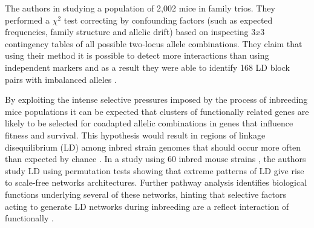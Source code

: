 The authors in \cite{ackermann2012systematic} studying a population of 2,002 mice in family trios.
They performed a $\chi^2$ test correcting by confounding factors (such as expected frequencies, family structure and allelic drift) based on inspecting $3 x 3$ contingency tables of all possible two-locus allele combinations.
They claim that using their method it is possible to detect more interactions than using independent markers and as a result they were able to identify 168 LD block pairs with imbalanced alleles \cite{ackermann2012systematic}.

By exploiting the  intense selective pressures imposed by the process of inbreeding mice populations it can be expected that clusters of functionally related genes are likely to be selected for coadapted allelic combinations in genes that influence fitness and survival.
This hypothesis would result in regions of linkage disequilibrium (LD) among inbred strain genomes that should occur more often than expected by chance \cite{petkov2005evidence}.
In a study using 60 inbred mouse strains \cite{petkov2005evidence}, the authors study LD using permutation tests showing that extreme patterns of LD give rise to scale-free networks architectures.
Further pathway analysis identifies biological functions underlying several of these networks, hinting that selective factors acting to generate LD networks during inbreeding are a reflect  interaction of functionally \cite{petkov2005evidence}.




